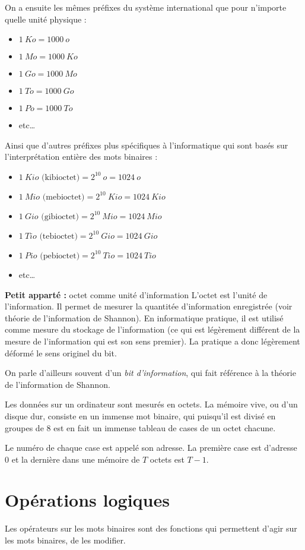 \documentclass[../../main.tex]{subfiles}
\begin{document}
On a ensuite les mêmes préfixes du système international que pour n'importe quelle unité physique :
\begin{itemize}
  \item $1\ Ko = 1000\ o$
  \item $1\ Mo = 1000\ Ko$
  \item $1\ Go = 1000\ Mo$
  \item $1\ To = 1000\ Go$
  \item $1\ Po = 1000\ To$
  \item etc\dots
\end{itemize}
Ainsi que d'autres préfixes plus spécifiques à l'informatique qui sont basés sur l'interprétation entière des mots binaires :
\begin{itemize}
  \item $1\ Kio \text{ (kibioctet)} = 2^{10}\ o = 1024\ o$
  \item $1\ Mio \text{ (mebioctet)} = 2^{10}\ Kio = 1024\ Kio$
  \item $1\ Gio \text{ (gibioctet)} = 2^{10}\ Mio = 1024\ Mio$
  \item $1\ Tio \text{ (tebioctet)} = 2^{10}\ Gio = 1024\ Gio$
  \item $1\ Pio \text{ (pebioctet)} = 2^{10}\ Tio = 1024\ Tio$
  \item etc\dots
\end{itemize}
\begin{minitelbasicbox}{\textbf{Petit apparté :} octet comme unité d'information}
L'octet est l'unité de l'information. Il permet de mesurer la quantitée d'information enregistrée (voir théorie de l'information de Shannon). En informatique pratique, il est utilisé comme mesure du stockage de l'information (ce qui est légèrement différent de la mesure de l'information qui est son sens premier). La pratique a donc légèrement déformé le sens originel du bit.

On parle d'ailleurs souvent d'un \textit{bit d'information}, qui fait référence à la théorie de l'information de Shannon.
\end{minitelbasicbox}
Les données sur un ordinateur sont mesurés en octets. La mémoire vive, ou d'un disque dur, consiste en un immense mot binaire, qui puisqu'il est divisé en groupes de 8 est en fait un immense tableau de cases de un octet chacune.

Le numéro de chaque case est appelé son adresse. La première case est d'adresse 0 et la dernière dans une mémoire de $T$ octets est $T-1$.
\section{Opérations logiques}
\label{sec:op_rations_logiques}
Les opérateurs sur les mots binaires sont des fonctions qui permettent d'agir sur les mots binaires, de les modifier.
\end{document}
